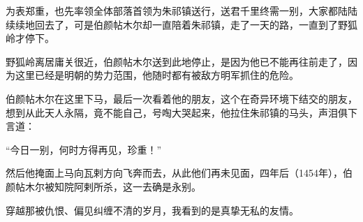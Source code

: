\begin{multicols}{\theparacolNo}
为表郑重，也先率领全体部落首领为朱祁镇送行，送君千里终需一别，大家都陆陆续续地回去了，可是伯颜帖木尔却一直陪着朱祁镇，走了一天的路，一直到了野狐岭才停下。

野狐岭离居庸关很近，伯颜帖木尔送到此地停止，是因为他已不能再往前走了，因为这里已经是明朝的势力范围，他随时都有被敌方明军抓住的危险。

伯颜帖木尔在这里下马，最后一次看着他的朋友，这个在奇异环境下结交的朋友，想到从此天人永隔，竟不能自己，号啕大哭起来，他拉住朱祁镇的马头，声泪俱下言道：

“今日一别，何时方得再见，珍重！”

然后他掩面上马向瓦剌方向飞奔而去，从此他们再未见面，四年后（1454年），伯颜帖木尔被知院阿剌所杀，这一去确是永别。

穿越那被仇恨、偏见纠缠不清的岁月，我看到的是真挚无私的友情。
\ifnum{}
	\end{multicols}
\fi
\newpage
